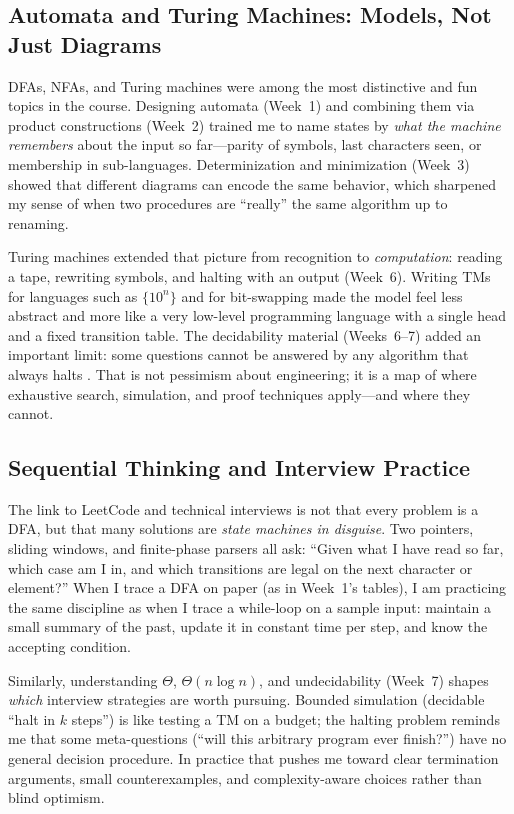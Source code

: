 \documentclass{article}
\theoremstyle{theorem}
\theoremstyle{definition}
\theoremstyle{remark}
\begin{document}
\subsection{Automata and Turing Machines: Models, Not Just Diagrams}\label{sec:synth-automata}

DFAs, NFAs, and Turing machines were among the most distinctive and fun topics in the course. Designing automata (Week~1) and combining them via product constructions (Week~2) trained me to name states by \emph{what the machine remembers} about the input so far---parity of symbols, last characters seen, or membership in sub-languages. Determinization and minimization (Week~3) showed that different diagrams can encode the same behavior, which sharpened my sense of when two procedures are ``really'' the same algorithm up to renaming.

Turing machines extended that picture from recognition to \emph{computation}: reading a tape, rewriting symbols, and halting with an output (Week~6). Writing TMs for languages such as $\{10^n\}$ and for bit-swapping made the model feel less abstract and more like a very low-level programming language with a single head and a fixed transition table. The decidability material (Weeks~6--7) added an important limit: some questions cannot be answered by any algorithm that always halts \cite{sipser}. That is not pessimism about engineering; it is a map of where exhaustive search, simulation, and proof techniques apply---and where they cannot.

\subsection{Sequential Thinking and Interview Practice}\label{sec:synth-practice}

The link to LeetCode and technical interviews is not that every problem is a DFA, but that many solutions are \emph{state machines in disguise}. Two pointers, sliding windows, and finite-phase parsers all ask: ``Given what I have read so far, which case am I in, and which transitions are legal on the next character or element?'' When I trace a DFA on paper (as in Week~1's tables), I am practicing the same discipline as when I trace a while-loop on a sample input: maintain a small summary of the past, update it in constant time per step, and know the accepting condition.

Similarly, understanding $\Theta$, $\Theta(n \log n)$, and undecidability (Week~7) shapes \emph{which} interview strategies are worth pursuing. Bounded simulation (decidable ``halt in $k$ steps'') is like testing a TM on a budget; the halting problem reminds me that some meta-questions (``will this arbitrary program ever finish?'') have no general decision procedure. In practice that pushes me toward clear termination arguments, small counterexamples, and complexity-aware choices rather than blind optimism.
\end{document}
